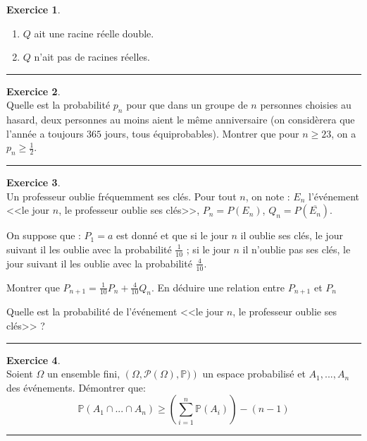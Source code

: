 \documentclass[a4paper,10pt]{article}
\theoremstyle{definition}
\theoremstyle{definition}
\newtheorem{exo}{Exercice}
\newcommand{\p}{\mathbb{P}}
\begin{document}
\begin{minipage}{1\linewidth}
\begin{minipage}[t]{0.48\linewidth}
\begin{exo}
\begin{enumerate}
	\item $Q$ ait une racine réelle double.
	\item $Q$ n'ait pas de racines réelles. 
	
\end{enumerate}	
		
		\centering
		\rule{1\linewidth}{0.6pt}
	\end{exo}
	

	\end{minipage}	
	\hfill\vrule\hfill
	\begin{minipage}[t]{0.48\linewidth}
		\raggedright
		
		
		\begin{exo}\quad\\
	Quelle est la probabilité $p_n$ pour que dans un groupe de $n$ personnes choisies au hasard, deux personnes au moins aient le même anniversaire (on considèrera que l'année a toujours $365$ jours, tous équiprobables). Montrer que pour $n\geq23$, on a $p_n\geq\frac{1}{2}$.
	
	\centering
	\rule{1\linewidth}{0.6pt}
\end{exo}
		
	
		\begin{exo}\quad\\
		Un professeur oublie fréquemment ses clés. Pour tout $n$, on note :
		$E_n$ l'événement <<le jour $n$, le professeur oublie ses clés>>, 
		$P_{n}=P(E_n)$, $Q_n=P(\overline{E_n})$.
		
		On suppose que : $P_{1}=a$ est donné et que si le jour $n$ il oublie ses clés, 
		le jour suivant il les oublie avec la probabilité $\frac{1}{10}$ ; 
		si le jour $n$ il n'oublie pas ses clés, le jour suivant il les oublie
		avec la probabilité $\frac{4}{10}$.
		
		Montrer que $P_{n+1}=\frac{1}{10}P_{n}+\frac{4}{10}Q_{n}$.
		En déduire une relation entre $P_{n+1}$ et $P_{n}$
		
		Quelle est la probabilité de l'événement <<le jour $n$, le professeur oublie ses clés>> ?
			
			\centering
			\rule{1\linewidth}{0.6pt}
		\end{exo}
	
	\begin{exo} \quad\\%
		Soient $\Omega$ un ensemble fini, $\left( \Omega, \mathcal{P}(\Omega),\p) \right)$ un espace probabilisé et $A_1,...,A_n$ des événements. Démontrer que:
		$$\p(A_1\cap...\cap A_n) \geq \left(\sum_{i=1}^{n} \p(A_i)\right) - (n-1)$$ 
		
		\centering
		\rule{1\linewidth}{0.6pt}
	\end{exo}	
	\end{minipage}
\end{minipage}
\end{document}
